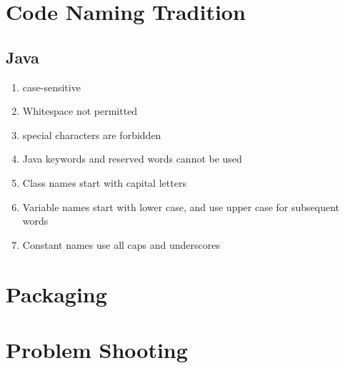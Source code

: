 \documentclass[12pt, a4paper]{report}
\begin{document}
\section{Code Naming Tradition}
    \subsection{Java}
    \begin{enumerate}
        \item case-sensitive
        \item Whitespace not permitted
        \item special characters are forbidden
        \item Java keywords and reserved words cannot be used
        \item Class names start with capital letters
        \item Variable names start with lower case, and use upper case for subsequent words
        \item Constant names use all caps and underscores
    \end{enumerate}
    
\section{Packaging}
\section{Problem Shooting}


\clearpage
\lstlistoflistings



\end{document}
